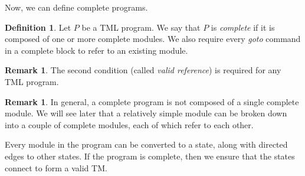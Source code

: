\documentclass{amsart}
\theoremstyle{definition}
\newtheorem{definition}[theorem]{Definition}
\newtheorem{remark}[theorem]{Remark}
\begin{document}
    Now, we can define complete programs.
    \begin{definition}
        Let $P$ be a TML program. We say that $P$ is \emph{complete} if it is composed of one or more complete modules. We also require every \textit{goto} command in a complete block to refer to an existing module.
    \end{definition}

    \begin{remark}
        The second condition (called \emph{valid reference}) is required for any TML program.
    \end{remark}

    \begin{remark}
        In general, a complete program is not composed of a single complete module. We will see later that a relatively simple module can be broken down into a couple of complete modules, each of which refer to each other.
    \end{remark}
    
    Every module in the program can be converted to a state, along with directed edges to other states. If the program is complete, then we ensure that the states connect to form a valid TM.
    
\end{document}
